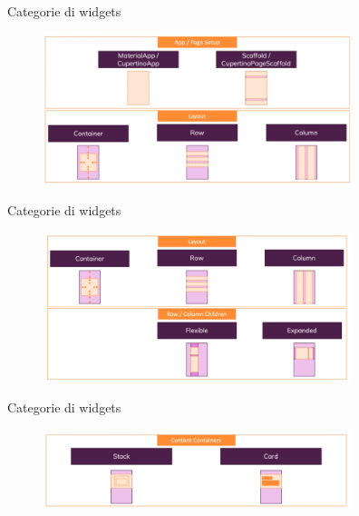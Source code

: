 \documentclass{../libs/presentation_format}
\begin{document}

\begin{frame}{Categorie di widgets}
	\begin{figure}[htpb]
		\centering
		\includegraphics[width=9cm]{../libs/widget-categories-1}
	\end{figure}
\end{frame}


\begin{frame}{Categorie di widgets}
	\begin{figure}[htpb]
		\centering
		\includegraphics[width=9cm]{../libs/widget-categories-2}
	\end{figure}
\end{frame}


\begin{frame}{Categorie di widgets}
	\begin{figure}[htpb]
		\centering
		\includegraphics[width=9cm]{../libs/widget-categories-3}
	\end{figure}
\end{frame}
\end{document}
